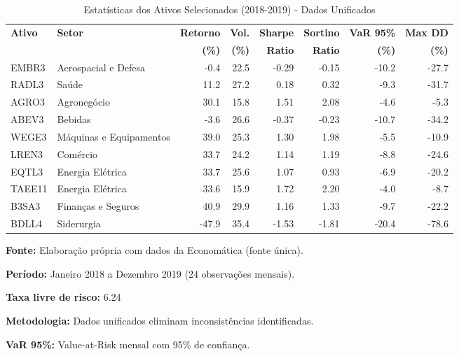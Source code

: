 
\begin{table}[H]
\centering
\caption{Estatísticas dos Ativos Selecionados (2018-2019) - Dados Unificados}
\label{tab:selected_assets_stats_unified}
\begin{adjustbox}{width=\textwidth}
\begin{tabular}{llrrrrrr}
\toprule
\textbf{Ativo} & \textbf{Setor} & 
\textbf{Retorno} & \textbf{Vol.} & \textbf{Sharpe} & 
\textbf{Sortino} & \textbf{VaR 95\%} & \textbf{Max DD} \\
& & \textbf{(\%)} & \textbf{(\%)} & 
\textbf{Ratio} & \textbf{Ratio} & \textbf{(\%)} & \textbf{(\%)} \\
\midrule
EMBR3 & Aerospacial e Defesa & -0.4 & 22.5 & -0.29 & -0.15 & -10.2 & -27.7 \\
RADL3 & Saúde & 11.2 & 27.2 & 0.18 & 0.32 & -9.3 & -31.7 \\
AGRO3 & Agronegócio & 30.1 & 15.8 & 1.51 & 2.08 & -4.6 & -5.3 \\
ABEV3 & Bebidas & -3.6 & 26.6 & -0.37 & -0.23 & -10.7 & -34.2 \\
WEGE3 & Máquinas e Equipamentos & 39.0 & 25.3 & 1.30 & 1.98 & -5.5 & -10.9 \\
LREN3 & Comércio & 33.7 & 24.2 & 1.14 & 1.19 & -8.8 & -24.6 \\
EQTL3 & Energia Elétrica & 33.7 & 25.6 & 1.07 & 0.93 & -6.9 & -20.2 \\
TAEE11 & Energia Elétrica & 33.6 & 15.9 & 1.72 & 2.20 & -4.0 & -8.7 \\
B3SA3 & Finanças e Seguros & 40.9 & 29.9 & 1.16 & 1.33 & -9.7 & -22.2 \\
BDLL4 & Siderurgia & -47.9 & 35.4 & -1.53 & -1.81 & -20.4 & -78.6 \\
\bottomrule
\end{tabular}
\end{adjustbox}
\begin{tablenotes}
\small
\item \textbf{Fonte:} Elaboração própria com dados da Economática (fonte única).
\item \textbf{Período:} Janeiro 2018 a Dezembro 2019 (24 observações mensais).
\item \textbf{Taxa livre de risco:} 6.24%
\item \textbf{Metodologia:} Dados unificados eliminam inconsistências identificadas.
\item \textbf{VaR 95\%:} Value-at-Risk mensal com 95\% de confiança.
\end{tablenotes}
\end{table}
